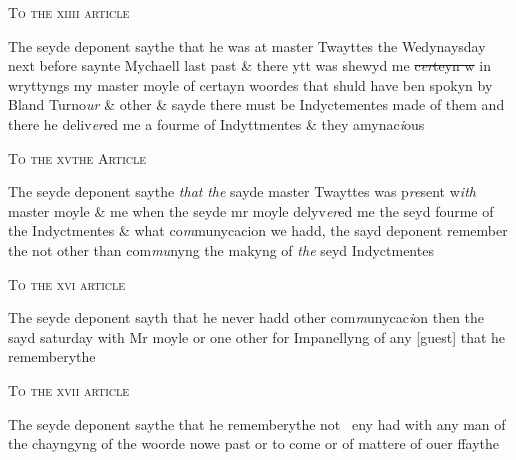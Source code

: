 \documentclass[12pt, a4paper]{book}
\begin{document}
				\begin{center}  {\scshape To the xiiii article}  \end{center}
			
 		
		\ifthenelse{\isodd{\thepage}}
		{\reversemarginpar}
		{\normalmarginpar}
		The seyde deponent saythe that he was at master Twayttes the Wedynaysday next before saynte Mychaell last past \& there ytt was shewyd me \sout{c\textit{er}teyn w }in wryttyngs my master moyle of certayn woordes that shuld have ben spokyn by Bland Turno\textit{ur} \& other \& sayde there must be Indyctementes made of them and there he deliv\textit{er}ed me a fourme of Indyttmentes \& they amynac\textit{i}ous 
 	
 		
				\begin{center}  {\scshape To the xvthe Article}  \end{center}
			
 	
		\ifthenelse{\isodd{\thepage}}
		{\reversemarginpar}
		{\normalmarginpar}
		The seyde deponent saythe \textit{that}
 		\textit{the} sayde master Twayttes was p\textit{re}sent w\textit{ith} master moyle \& me when the seyde mr moyle delyv\textit{er}ed me the seyd fourme of the 
			Indyctmentes \& what co\textit{m}munycacion we hadd, the sayd deponent remember the not other than com\textit{mu}nyng the makyng of \textit{the} seyd Indyctmentes
 	
				\begin{center}  {\scshape To the xvi article}  \end{center}
			
 	
		\ifthenelse{\isodd{\thepage}}
		{\reversemarginpar}
		{\normalmarginpar}
		The seyde deponent sayth that he never hadd other com\textit{m}unycac\textit{i}on then the sayd saturday with Mr moyle or one other for Impanellyng of  any [guest] that he rememberythe 
 	
				\begin{center}  {\scshape To the xvii article}  \end{center}
			
 	
		\ifthenelse{\isodd{\thepage}}
		{\reversemarginpar}
		{\normalmarginpar}
		The seyde deponent saythe that he rememberythe not  
			eny had with any man of the chayngyng of the woorde nowe past or to come or of mattere of ouer ffaythe

\dotfill
					
\end{document}
